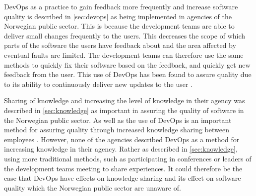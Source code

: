 \newpage

DevOps as a practice to gain feedback more frequently and increase software quality is described in \autoref{sec:devops} as being implemented in agencies of the Norwegian public sector. This is because the development teams are able to deliver small changes frequently to the users. This decreases the scope of which parts of the software the users have feedback about and the area affected by eventual faults are limited. The development teams can therefore use the same methods to quickly fix their software based on the feedback, and quickly get new feedback from the user. This use of DevOps has been found to assure quality due to its ability to continuously deliver new updates to the user \cite{am_2020}\cite{smm_2018}\cite{ml_2022}.


Sharing of knowledge and increasing the level of knowledge in their agency was described in \autoref{sec:knowledge} as important in assuring the quality of software in the Norwegian public sector. As well as the use of DevOps is an important method for assuring quality through increased knowledge sharing between employees \cite{smm_2018}\cite{mm_2021}. However, none of the agencies described DevOps as a method for increasing knowledge in their agency. Rather as described in \autoref{sec:knowledge}, using more traditional methods, such as participating in conferences or leaders of the development teams meeting to share experiences. It could therefore be the case that DevOps have effects on knowledge sharing and its effect on software quality which the Norwegian public sector are unaware of.


